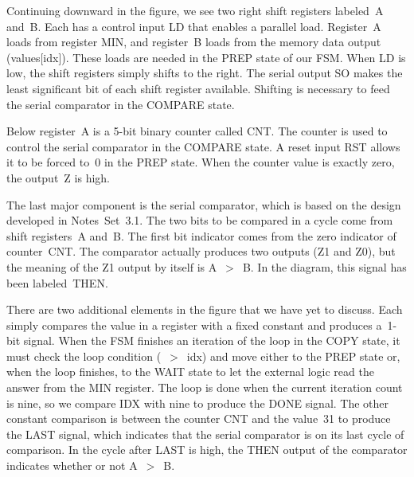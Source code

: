 Continuing downward in the figure, we see two right shift registers
labeled~{\tfix A} and~{\tfix B}.  Each has a control input {\tfix LD}
that enables a parallel load.  Register~{\tfix A} loads from register
{\tfix MIN}, and register~{\tfix B} loads from the memory data output
({\tfix values[idx]}).  These loads are needed in the {\tfix PREP}
state of our FSM.  When {\tfix LD} is low, the shift registers
simply shifts to the right.  The serial output {\tfix SO} makes the
least significant bit of each shift register available.  Shifting
is necessary to feed the serial comparator in the {\tfix COMPARE} state.

Below register~{\tfix A} is a \mbox{5-bit} binary counter called {\tfix CNT}.
The counter is used to control the serial comparator in the {\tfix COMPARE}
state.  A reset input {\tfix RST} allows it to be forced to~0 in the 
{\tfix PREP} state.  When the counter value is exactly zero, the 
output~{\tfix Z} is high.

\pagebreak

The last major component is the serial comparator, which is based on the
design developed in Notes~Set~3.1.  The two bits to be compared in 
a cycle come from shift registers~{\tfix A} and~{\tfix B}.  The first
bit indicator comes from the zero indicator of counter~{\tfix CNT}.
The comparator actually produces two outputs ({\tfix Z1} and {\tfix Z0}),
but the meaning of the
{\tfix Z1} output by itself is {\tfix A~$>$~B}.  In the diagram,
this signal has been labeled~{\tfix THEN}.

There are two additional elements in the figure that we have yet to discuss.
Each simply compares the value in a register with a fixed constant and 
produces a~\mbox{1-bit} signal.  When the FSM finishes an iteration of
the loop in the {\tfix COPY} state, it must check the loop condition
({~$>$~idx}) and move either to the {\tfix PREP} state or, when
the loop finishes, to the {\tfix WAIT} state to let the external logic
read the answer from the {\tfix MIN} register.  The loop is done when the
current iteration count is nine, so we compare {\tfix IDX} with nine to
produce the {\tfix DONE} signal.  The other constant comparison is between
the counter {\tfix CNT} and the value~31 to produce the {\tfix LAST} signal,
which indicates that the serial comparator is on its last cycle of 
comparison.  In the cycle after {\tfix LAST} is high, the {\tfix THEN} 
output of the comparator indicates whether or not {\tfix A~$>$~B}.\\

